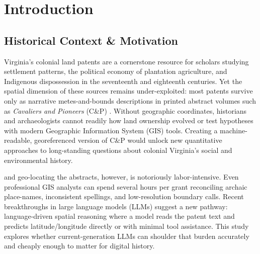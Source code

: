 \section{Introduction}\label{introduction}

\subsection{Historical Context \&
Motivation}\label{historical-context-motivation}

Virginia's colonial land patents are a cornerstone resource for scholars
studying settlement patterns, the political economy of plantation
agriculture, and Indigenous dispossession in the seventeenth and
eighteenth centuries. Yet the spatial dimension of these sources remains
under-exploited: most patents survive only as narrative metes-and-bounds
descriptions in printed abstract volumes such as \emph{Cavaliers and
Pioneers} (C\&P) \citep{Nugent1979_cavaliers3}. Without geographic
coordinates, historians and archaeologists cannot readily \DIFdelbegin {}\DIFdelend \DIFaddbegin {}\DIFaddend how
land ownership evolved or test hypotheses with modern Geographic
Information System (GIS) tools. Creating a machine-readable,
georeferenced version of C\&P would unlock new quantitative approaches
to long-standing questions about colonial Virginia's social and
environmental history.

\DIFdelbegin {}\DIFdelend \DIFaddbegin {}\DIFaddend and geo-locating the abstracts, however, is notoriously
labor-intensive. Even professional GIS analysts can spend several hours
per grant reconciling archaic place-names, inconsistent spellings, and
low-resolution boundary calls. Recent breakthroughs in large language
models (LLMs) suggest a new pathway: language-driven spatial reasoning
where a model reads the patent text and predicts latitude/longitude
directly or with minimal tool assistance. This study explores whether
current-generation LLMs can shoulder that burden accurately and cheaply
enough to matter for digital history.

\DIFaddbegin \begin{quote}

\end{quote}

